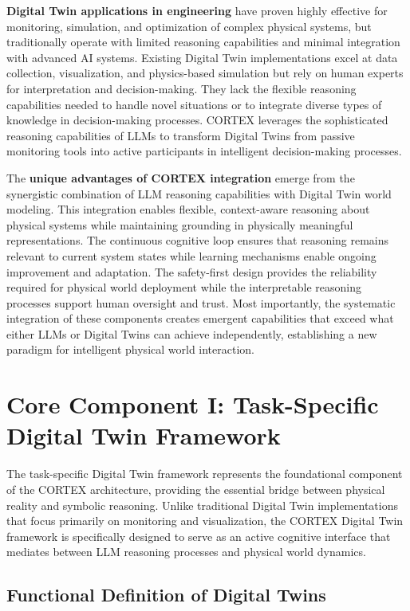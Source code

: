 \textbf{Digital Twin applications in engineering} have proven highly effective for monitoring, simulation, and optimization of complex physical systems, but traditionally operate with limited reasoning capabilities and minimal integration with advanced AI systems. Existing Digital Twin implementations excel at data collection, visualization, and physics-based simulation but rely on human experts for interpretation and decision-making. They lack the flexible reasoning capabilities needed to handle novel situations or to integrate diverse types of knowledge in decision-making processes. CORTEX leverages the sophisticated reasoning capabilities of LLMs to transform Digital Twins from passive monitoring tools into active participants in intelligent decision-making processes.

The \textbf{unique advantages of CORTEX integration} emerge from the synergistic combination of LLM reasoning capabilities with Digital Twin world modeling. This integration enables flexible, context-aware reasoning about physical systems while maintaining grounding in physically meaningful representations. The continuous cognitive loop ensures that reasoning remains relevant to current system states while learning mechanisms enable ongoing improvement and adaptation. The safety-first design provides the reliability required for physical world deployment while the interpretable reasoning processes support human oversight and trust. Most importantly, the systematic integration of these components creates emergent capabilities that exceed what either LLMs or Digital Twins can achieve independently, establishing a new paradigm for intelligent physical world interaction.

\section{Core Component I: Task-Specific Digital Twin Framework}

The task-specific Digital Twin framework represents the foundational component of the CORTEX architecture, providing the essential bridge between physical reality and symbolic reasoning. Unlike traditional Digital Twin implementations that focus primarily on monitoring and visualization, the CORTEX Digital Twin framework is specifically designed to serve as an active cognitive interface that mediates between LLM reasoning processes and physical world dynamics.

\subsection{Functional Definition of Digital Twins}

